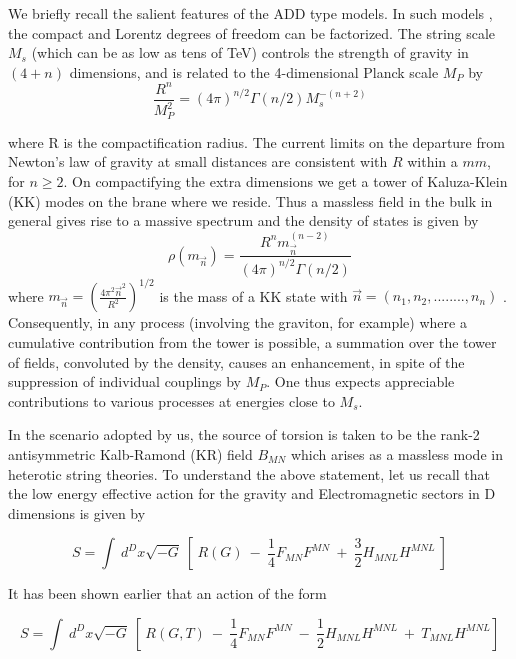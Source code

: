 \documentclass[a4paper,12pt]{article}
\begin{document}
We briefly recall the salient features of the ADD type models. In
such models \cite{add} , the compact and Lorentz degrees of
freedom can be factorized. The string scale $M_s$ (which can be
as low as tens of TeV) controls the strength of gravity in $(4+n)$
dimensions, and is related to the 4-dimensional Planck scale
$M_P$ by
\begin{equation}
\frac{R^n}{M_P^2} = (4\pi)^{n/2}\Gamma(n/2) M_s^{-(n+2)}
\end{equation}

\noindent where  R is the compactification radius. The current
limits on the departure from Newton's law of gravity at small
distances are consistent with $R$ within a $mm$, for $n \ge 2$.
On compactifying the extra dimensions we get a tower of
Kaluza-Klein (KK) modes on the brane where we reside. Thus a
massless field in the bulk in general gives rise to a massive
spectrum and  the density of states is given by
\begin{equation}
\rho({m}_{\vec{n}})=\frac{R^n
{{m}_{\vec{n}}^{(n-2)}}}{(4\pi)^{n/2}\Gamma(n/2)}
\end{equation}
where ${{m}_{\vec{n}}}={(\frac{4\pi^2{\vec{n}}^2}{R^2})}^{1/2}$
is the mass of a KK state with $\vec{n}=(n_1,n_2,........,n_n)$
\cite{han}. Consequently, in any process (involving the graviton,
for example) where a cumulative contribution from the tower is
possible, a summation over the tower of fields, convoluted by the
density, causes an enhancement, in spite of the suppression of
individual couplings by $M_P$. One thus expects appreciable
contributions to various processes at energies close to $M_s$.

In the scenario adopted by us, the source of torsion is taken to
be the rank-2 antisymmetric Kalb-Ramond (KR) field $B_{MN}$ which
arises as a massless mode in heterotic string theories\cite{gsw}.
To understand the above statement, let us recall that the low
energy effective action for the gravity and  Electromagnetic
sectors in D dimensions is given by

\begin{equation}
S = \int~ d^{D}x \sqrt{-G} ~\left[~R(G) ~-~
    \frac{1}{4} F_{MN}F^{MN} ~+~
    \frac{3}{2} H_{MNL}H^{MNL} ~\right]
\end{equation}

It has been shown earlier \cite{pmssg} that an action of the form

\begin{equation}
S = \int~ d^{D}x \sqrt{-G} ~\left[~R (G,T) ~-~
    \frac{1}{4} F_{MN} F^{MN} ~-~
    \frac{1}{2}H_{MNL} H^{MNL} ~+~
     T_{MNL}H^{MNL}\right]
\end{equation}
\end{document}
